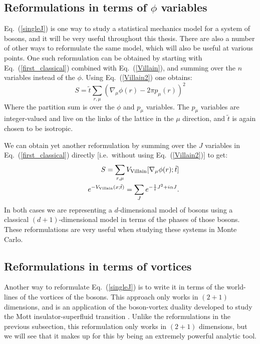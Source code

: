 \subsection{Reformulations in terms of $\phi$ variables}
Eq.~(\ref{singleJ}) is one way to study a statistical mechanics model for a system of bosons, and it will be very useful throughout this thesis. There are also a number of other ways to reformulate the same model, which will also be useful at various points. One such reformulation can be obtained by starting with Eq.~(\ref{first_classical}) combined with Eq.~(\ref{Villain}), and summing over the $n$ variables instead of the $\phi$. Using Eq.~(\ref{Villain2}) one obtains:
\begin{equation}
S=\tilde t \sum_{r,\mu} (\nabla_\mu \phi(r)-2\pi p_\mu(r))^2
\label{singleRods}
\end{equation}
Where the partition sum is over the $\phi$ and $p_\mu$ variables. The $p_\mu$ variables are integer-valued and live on the links of the lattice in the $\mu$ direction, and $\tilde t$ is again chosen to be isotropic. 

We can obtain yet another reformulation by summing over the $J$ variables in Eq.~(\ref{first_classical}) directly [i.e.~without using Eq.~(\ref{Villain2})] to get:
\begin{eqnarray}
&&S=\sum_{r,\mu} V_{\rm Villain} [\nabla_\mu \phi(r);\tilde t]\nonumber\\
&&e^{-V_{\rm Villain}(x;\tilde t)}=\sum_{J} e^{-\frac{1}{\tilde t} J^2+i\alpha J}.
\label{singleVillain}
\end{eqnarray}
In both cases we are representing a $d$-dimensional model of bosons using a classical $(d+1)$-dimensional model in terms of the phases of those bosons. These reformulations are very useful when studying these systems in Monte Carlo. 

\subsection{Reformulations in terms of vortices}
\label{subsec::JtoQ}
Another way to reformulate Eq.~(\ref{singleJ}) is to write it in terms of the world-lines of the vortices of the bosons. This approach only works in $(2+1)$ dimensions, and is an application of the boson-vortex duality developed to study the Mott insulator-superfluid transition\cite{PolyakovBook, Peskin1978, Dasgupta1981, FisherLee1989, LeeFisher1989, artphoton,short_range3} . Unlike the reformulations in the previous subsection, this reformulation only works in $(2+1)$ dimensions, but we will see that it makes up for this by being an extremely powerful analytic tool. 

